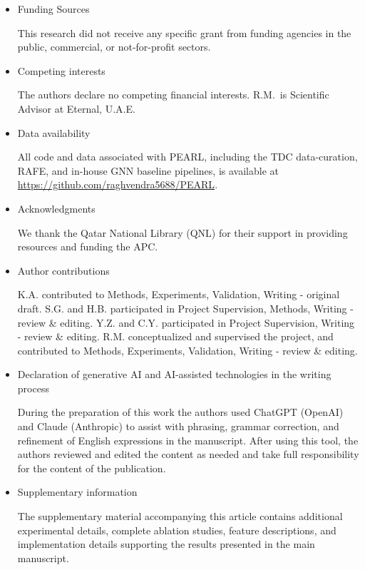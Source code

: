 \documentclass[pdflatex,sn-mathphys-num]{sn-jnl}%
\begin{document}
\begin{itemize}
\item Funding Sources

This research did not receive any specific grant from funding agencies in the public, commercial, or not-for-profit sectors.

\item Competing interests

The authors declare no competing financial interests. R.M.\ is Scientific Advisor at Eternal, U.A.E.

\item Data availability

All code and data associated with PEARL, including the TDC data-curation, RAFE, and in-house GNN baseline pipelines, is available at \url{https://github.com/raghvendra5688/PEARL}.

\item Acknowledgments

We thank the Qatar National Library (QNL) for their support in providing resources and funding the APC.

\item Author contributions

K.A. contributed to Methods, Experiments, Validation, Writing - original draft. S.G. and H.B. participated in Project Supervision, Methods, Writing - review \& editing. Y.Z. and C.Y. participated in Project Supervision, Writing - review \& editing. R.M. conceptualized and supervised the project, and contributed to Methods, Experiments, Validation, Writing - review \& editing.

\item{Declaration of generative AI and AI-assisted technologies in the writing process}

During the preparation of this work the authors used ChatGPT (OpenAI) and Claude (Anthropic) to assist with phrasing, grammar correction, and refinement of English expressions in the manuscript. After using this tool, the authors reviewed and edited the content as needed and take full responsibility for the content of the publication.

\item{Supplementary information}

The supplementary material accompanying this article contains additional experimental details, complete ablation studies, feature descriptions, and implementation details supporting the results presented in the main manuscript.

\end{itemize}
\end{document}
